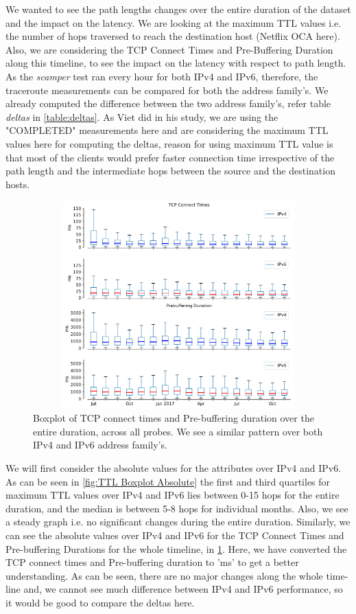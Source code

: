 We wanted to see the path lengths changes over the entire duration of the dataset and the impact on the latency. 
We are looking at the maximum TTL values i.e. the number of hops traversed to reach the destination host (Netflix OCA here). 
Also, we are considering the TCP Connect Times and Pre-Buffering Duration along this timeline, to see the impact on the latency with respect to path length. 
As the \textit{scamper} test ran every hour for both IPv4 and IPv6, therefore, the traceroute measurements can be compared for both the address family's. 
We already computed the difference between the two address family's, refer table \textit{deltas} in \cref{table:deltas}. 
As Viet \cite{viet} did in his study, we are using the "COMPLETED" measurements here and are considering the maximum TTL values here for computing the deltas, 
reason for using maximum TTL value is that most of the clients would prefer faster connection time irrespective of the path length and the intermediate hops 
between the source and the destination hosts. 

\begin{figure}[!ht]
	\centering
	\includegraphics[keepaspectratio, height=8cm, width=15cm]{figures/traceroute/netflix-delay-boxplot-separate.pdf}
	\caption[TCP Connect Times and PreBuffering Duration Boxplot Absolute]{Boxplot of TCP connect times and Pre-buffering duration over the entire duration, across all probes. We see a similar pattern over both IPv4 and IPv6 address family's.}
	\label{fig:TCP Connect Times and PreBuffering Duration Boxplot Absolute}
\end{figure}

We will first consider the absolute values for the attributes over IPv4 and IPv6. As can be seen in \cref{fig:TTL Boxplot Absolute} the first and third quartiles for 
maximum TTL values over IPv4 and IPv6 lies between 0-15 hops for the entire duration, and the median is between 5-8 hops for individual months. Also, we see a steady graph i.e. 
no significant changes during the entire duration. Similarly, we can see the absolute values over IPv4 and IPv6 for the TCP Connect Times and Pre-buffering Durations 
for the whole timeline, in \cref{fig:TCP Connect Times and PreBuffering Duration Boxplot Absolute}. Here, we have converted the TCP connect times and Pre-buffering duration 
to 'ms' to get a better understanding. As can be seen, there are no major changes along the whole time-line and, we cannot see much difference between IPv4 and IPv6 performance, 
so it would be good to compare the deltas here. 

